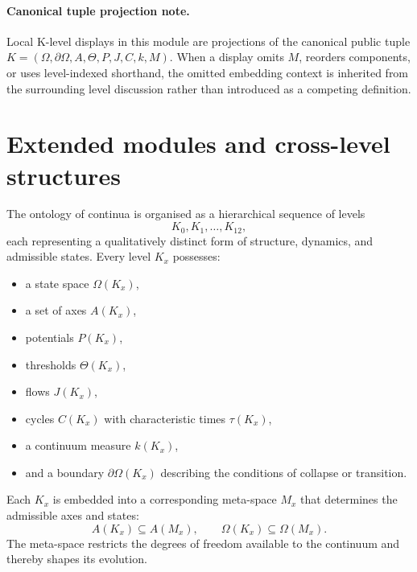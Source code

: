 


\paragraph{Canonical tuple projection note.}
Local K-level displays in this module are projections of the canonical public tuple \(K=(\Omega,\partial\Omega,A,\Theta,P,J,C,k,M)\). When a display omits \(M\), reorders components, or uses level-indexed shorthand, the omitted embedding context is inherited from the surrounding level discussion rather than introduced as a competing definition.

\section{Extended modules and cross-level structures}
\label{sec:klevels-master}

The ontology of continua is organised as a hierarchical sequence of
levels
\[
K_0, K_1, \dots, K_{12},
\]
each representing a qualitatively distinct form of structure,
dynamics, and admissible states.
Every level $K_x$ possesses:
\begin{itemize}
    \item a state space $\Omega(K_x)$,
    \item a set of axes $A(K_x)$,
    \item potentials $P(K_x)$,
    \item thresholds $\Theta(K_x)$,
    \item flows $J(K_x)$,
    \item cycles $C(K_x)$ with characteristic times $\tau(K_x)$,
    \item a continuum measure $k(K_x)$,
    \item and a boundary $\partial\Omega(K_x)$ describing the conditions
          of collapse or transition.
\end{itemize}

Each $K_x$ is embedded into a corresponding meta-space $M_x$ that
determines the admissible axes and states:
\[
A(K_x) \subseteq A(M_x), \qquad
\Omega(K_x) \subseteq \Omega(M_x).
\]
The meta-space restricts the degrees of freedom available to the
continuum and thereby shapes its evolution.


